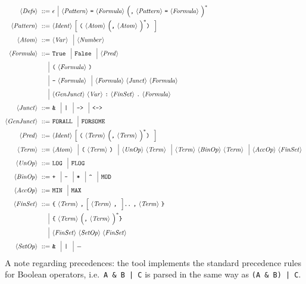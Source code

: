 \documentclass[twoside]{article}
\begin{document}
\begin{align*}
\nonterm{Defs} ::=\ & \epsilon \altn \nonterm{Pattern} \term{=} \nonterm{Formula} \group{\term{,} \nonterm{Pattern} \term{=} \nonterm{Formula}}^* \\
\nonterm{Pattern} ::=\ &\nonterm{Ident} \optional{\term{(} \nonterm{Atom} \group{\term{,} \nonterm{Atom}}^* \term{)}} \\
\nonterm{Atom} ::=\ &\nonterm{Var} \altn \nonterm{Number} \\
\nonterm{Formula} ::=\ & \term{True} \altn \term{False} \altn \nonterm{Pred} \\
                 \altn & \term{(} \nonterm{Formula} \term{)} \\
                 \altn & \term{-} \nonterm{Formula} \altn \nonterm{Formula} \nonterm{Junct} \nonterm{Formula} \\
                 \altn & \nonterm{GenJunct} \nonterm{Var} \term{:} \nonterm{FinSet} \term{.} \nonterm{Formula} \\
\nonterm{Junct} ::=\ & \term{\&} \altn \term{|} \altn \term{->} \altn \term{<->} \\
\nonterm{GenJunct} ::=\ & \term{FORALL} \altn \term{FORSOME} \\
\nonterm{Pred} ::=\ & \nonterm{Ident} \optional{\term{(} \nonterm{Term} \group{\term{,} \nonterm{Term}}^* \term{)}} \\
\nonterm{Term} ::=\ & \nonterm{Atom} \altn \term{(} \nonterm{Term} \term{)} \altn \nonterm{UnOp} \nonterm{Term} \altn \nonterm{Term} \nonterm{BinOp} \nonterm{Term} \altn \nonterm{AccOp} \nonterm{FinSet} \\
\nonterm{UnOp} ::=\ & \term{LOG} \altn \term{FLOG} \\
\nonterm{BinOp} ::=\ &\term{+} \altn \term{-} \altn \term{*} \altn \term{\textasciicircum} \altn \term{MOD} \\
\nonterm{AccOp} ::=\ &\term{MIN} \altn \term{MAX} \\
\nonterm{FinSet} ::=\ & \term{\{} \nonterm{Term} \term{,} \optional{\nonterm{Term} \term{,}} \term{..} \term{,} \nonterm{Term} \term{\}} \\
                \altn & \term{\{} \nonterm{Term} \group{\term{,} \nonterm{Term}}^* \term{\}} \\
                \altn & \nonterm{FinSet} \nonterm{SetOp} \nonterm{FinSet} \\
\nonterm{SetOp} ::=\ & \term{\&} \altn \term{|} \altn{-} 
\end{align*}
A note regarding precedences: the \DiMo tool implements the standard precedence rules for Boolean operators, i.e.\ \texttt{A \& B | C} is parsed in the same way as
\texttt{(A \& B) | C}. 
\end{document}
